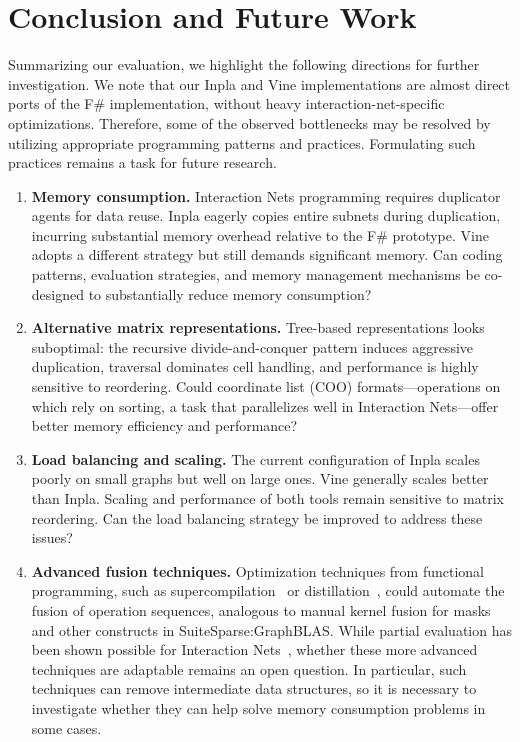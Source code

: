 \section{Conclusion and Future Work}\label{sec:conclusion}

Summarizing our evaluation, we highlight the following directions for further investigation.
We note that our Inpla and Vine implementations are almost direct ports of the F\# implementation, without heavy interaction-net-specific optimizations. Therefore, some of the observed bottlenecks may be resolved by utilizing appropriate programming patterns and practices. Formulating such practices remains a task for future research.

\begin{enumerate}
    \item \textbf{Memory consumption.} Interaction Nets programming requires duplicator agents for data reuse. Inpla eagerly copies entire subnets during duplication, incurring substantial memory overhead relative to the F\# prototype. Vine adopts a different strategy but still demands significant memory. Can coding patterns, evaluation strategies, and memory management mechanisms be co-designed to substantially reduce memory consumption?
    
    \item \textbf{Alternative matrix representations.} Tree-based representations looks suboptimal: the recursive divide-and-conquer pattern induces aggressive duplication, traversal dominates cell handling, and performance is highly sensitive to reordering. Could coordinate list (COO) formats---operations on which rely on sorting, a task that parallelizes well in Interaction Nets---offer better memory efficiency and performance?
    
   \item \textbf{Load balancing and scaling.} The current configuration of Inpla scales poorly on small graphs but well on large ones. Vine generally scales better than Inpla. Scaling and performance of both tools remain sensitive to matrix reordering. Can the load balancing strategy be improved to address these issues?
    
    \item \textbf{Advanced fusion techniques.} Optimization techniques from functional programming, such as supercompilation~\cite{10.1007/3-540-62064-8_20} or distillation~\cite{10.1007/978-3-030-98869-2_7}, could automate the fusion of operation sequences, analogous to manual kernel fusion for masks and other constructs in SuiteSparse:GraphBLAS. While partial evaluation has been shown possible for Interaction Nets~\cite{DBLP:conf/sas/Bechet92}, whether these more advanced techniques are adaptable remains an open question. In particular, such techniques can remove intermediate data structures, so it is necessary to investigate whether they can help solve memory consumption problems in some cases.
    

\end{enumerate}
